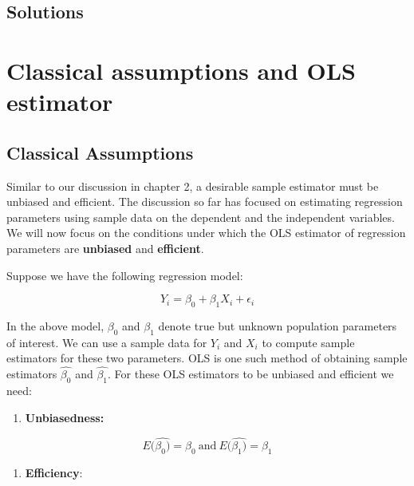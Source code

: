 \documentclass[
]{book}
\providecommand{\tightlist}{%
  \setlength{\itemsep}{0pt}\setlength{\parskip}{0pt}}
\theoremstyle{definition}
\theoremstyle{definition}
\theoremstyle{definition}
\theoremstyle{definition}
\theoremstyle{remark}
\begin{document}
\hypertarget{solutions-4}{%
\section*{Solutions}\label{solutions-4}}

\hypertarget{classical-assumptions-and-ols-estimator}{%
\chapter{Classical assumptions and OLS estimator}\label{classical-assumptions-and-ols-estimator}}

\hypertarget{classical-assumptions}{%
\section{Classical Assumptions}\label{classical-assumptions}}

Similar to our discussion in chapter 2, a desirable sample estimator must be unbiased and efficient. The discussion so far has focused on estimating regression parameters using sample data on the dependent and the independent variables. We will now focus on the conditions under which the OLS estimator of regression parameters are \textbf{unbiased} and \textbf{efficient}.

Suppose we have the following regression model:

\[Y_i = \beta_0 + \beta_1  X_i+ \epsilon_i\]

In the above model, \(\beta_0\) and \(\beta_1\) denote true but unknown population parameters of interest. We can use a sample data for \(Y_i\) and \(X_i\) to compute sample estimators for these two parameters. OLS is one such method of obtaining sample estimators \(\hat{\beta_0}\) and \(\hat{\beta_1}\). For these OLS estimators to be unbiased and efficient we need:

\begin{enumerate}
\def\labelenumi{\arabic{enumi}.}
\tightlist
\item
  \textbf{Unbiasedness:}
\end{enumerate}

\[E(\hat{\beta_0)}=\beta_0 \ \text{and} \ E(\hat{\beta_1)}=\beta_1\]

\begin{enumerate}
\def\labelenumi{\arabic{enumi}.}
\setcounter{enumi}{1}
\tightlist
\item
  \textbf{Efficiency}:
\end{enumerate}
\end{document}
